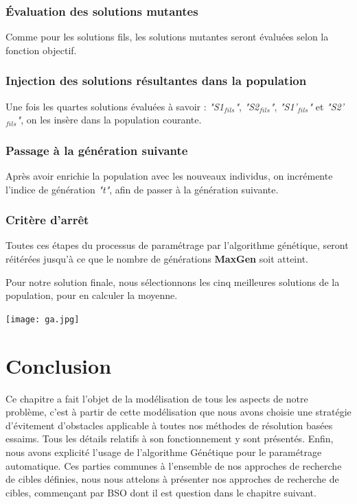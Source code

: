 \subsubsection{Évaluation des solutions mutantes}
Comme pour les solutions fils, les solutions mutantes seront évaluées selon la fonction objectif.

\subsubsection{Injection des solutions résultantes dans la population}
Une fois les quartes solutions évaluées à savoir : \textit{"S1$_{fils}$"}, \textit{"S2$_{fils}$"}, \textit{"S1'$_{fils}$"} et \textit{"S2'$_{fils}$"}, on les insère dans la population courante.

\subsubsection{Passage à la génération suivante}
Après avoir enrichie la population avec les nouveaux individus, on incrémente  l'indice de génération \textit{"t"}, afin de passer à la génération suivante.

\subsubsection{Critère d'arrêt}
Toutes ces étapes du processus de paramétrage par l'algorithme génétique, seront réitérées jusqu'à ce que le nombre de générations \textbf{MaxGen} soit atteint. 



Pour notre solution finale, nous sélectionnons les cinq meilleures solutions de la population, pour en calculer la moyenne.


\noindent
\begin{center}	  
	\captionsetup{width=1\linewidth}
	\texttt{[image: ga.jpg]}%
	\vspace{-0.3 cm}
	\label{ga}%
\end{center}


\section{Conclusion}
Ce chapitre a fait l'objet de la modélisation de tous les aspects de notre problème, c'est à partir de cette modélisation que nous avons choisie une stratégie d'évitement d'obstacles applicable à toutes nos méthodes de résolution basées essaims. Tous les détails relatifs à son fonctionnement y sont présentés. Enfin, nous avons explicité l'usage de l'algorithme Génétique pour le paramétrage automatique.
Ces parties communes à l'ensemble de nos approches de recherche de cibles définies, nous nous attelons à présenter nos approches de recherche de cibles, commençant par BSO dont il est question dans le chapitre suivant.


